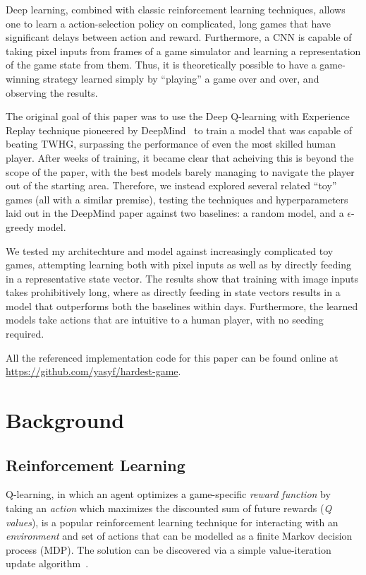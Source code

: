 \documentclass[12pt]{article}
\begin{document}
Deep learning, combined with classic reinforcement learning techniques, allows one to learn a action-selection policy on complicated, long games that have significant delays between action and reward. Furthermore, a CNN is capable of taking pixel inputs from frames of a game simulator and learning a representation of the game state from them. Thus, it is theoretically possible to have a game-winning strategy learned simply by ``playing'' a game over and over, and observing the results.

The original goal of this paper was to use the Deep Q-learning with Experience Replay technique pioneered by DeepMind~\cite{deepmind} to train a model that was capable of beating TWHG, surpassing the performance of even the most skilled human player. After weeks of training, it became clear that acheiving this is beyond the scope of the paper, with the best models barely managing to navigate the player out of the starting area. Therefore, we instead explored several related ``toy'' games (all with a similar premise), testing the techniques and hyperparameters laid out in the DeepMind paper against two baselines: a random model, and a $\epsilon$-greedy model.

We tested my architechture and model against increasingly complicated toy games, attempting learning both with pixel inputs as well as by directly feeding in a representative state vector. The results show that training with image inputs takes prohibitively long, where as directly feeding in state vectors results in a model that outperforms both the baselines within days. Furthermore, the learned models take actions that are intuitive to a human player, with no seeding required.

All the referenced implementation code for this paper can be found online at \url{https://github.com/yasyf/hardest-game}.

\section{Background}

\subsection{Reinforcement Learning}

Q-learning, in which an agent optimizes a game-specific \textit{reward function} by taking an \textit{action} which maximizes the discounted sum of future rewards (\textit{Q values}), is a popular reinforcement learning technique for interacting with an \textit{environment} and set of actions that can be modelled as a finite Markov decision process (MDP). The solution can be discovered via a simple value-iteration update algorithm~\cite{Watkins1992}.
\end{document}
